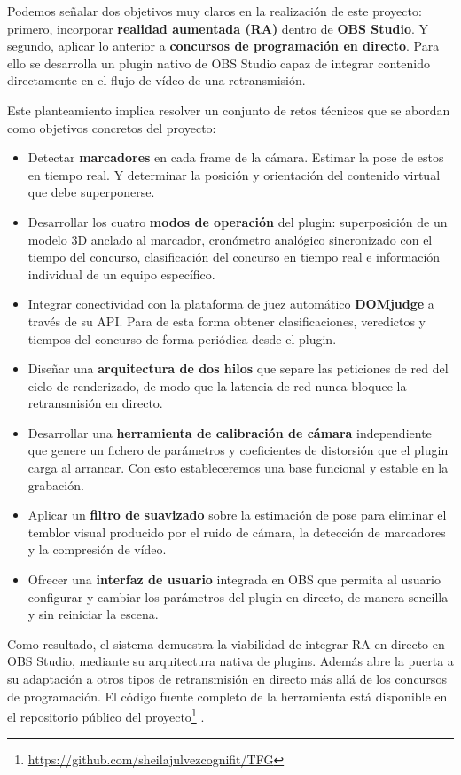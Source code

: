     Podemos señalar dos objetivos muy claros en la realización de este proyecto: primero, incorporar \textbf{realidad aumentada (RA)} dentro de \textbf{OBS Studio}. Y segundo, aplicar lo anterior a \textbf{concursos de programación en directo}. Para ello se desarrolla un plugin nativo de OBS Studio capaz de integrar contenido directamente en el flujo de vídeo de una retransmisión.
    
    Este planteamiento implica resolver un conjunto de retos técnicos que se abordan como objetivos concretos del proyecto:
    
    \begin{itemize}
      \item Detectar \textbf{marcadores} en cada frame de la cámara. Estimar la pose de estos en tiempo real. Y  determinar la posición y orientación del contenido virtual que debe superponerse.
  \item Desarrollar los cuatro \textbf{modos de operación} del plugin: superposición de un modelo 3D anclado al marcador, cronómetro analógico sincronizado con el tiempo del concurso, clasificación del concurso en tiempo real e información individual de un equipo específico.
  \item Integrar conectividad con la plataforma de juez automático \textbf{DOMjudge} a través de su API. Para de esta forma obtener clasificaciones, veredictos y tiempos del concurso de forma periódica desde el plugin.
  \item Diseñar una \textbf{arquitectura de dos hilos} que separe las peticiones de red del ciclo de renderizado, de modo que la latencia de red nunca bloquee la retransmisión en directo.
  \item Desarrollar una \textbf{herramienta de calibración de cámara} independiente que genere un fichero de parámetros y coeficientes de distorsión que el plugin carga al arrancar. Con esto estableceremos una base funcional y estable en la grabación.
  \item Aplicar un \textbf{filtro de suavizado} sobre la estimación de pose para eliminar el temblor visual producido por el ruido de cámara, la detección de marcadores y la compresión de vídeo.
  \item Ofrecer una \textbf{interfaz de usuario} integrada en OBS que permita al usuario configurar y cambiar los parámetros del plugin en directo, de manera sencilla y sin reiniciar la escena.
\end{itemize}

Como resultado, el sistema demuestra la viabilidad de integrar RA en directo en OBS Studio, mediante su arquitectura nativa de plugins. Además abre la puerta a su adaptación a otros tipos de retransmisión en directo más allá de los concursos de programación. El código fuente completo de la herramienta está disponible en el repositorio público del proyecto\footnote{\url{https://github.com/sheilajulvezcognifit/TFG}} \citep{PluginRepo}.

